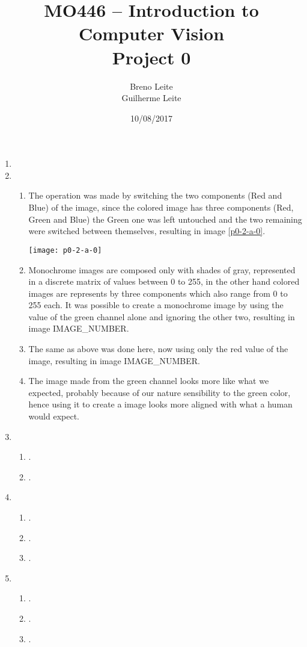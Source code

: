\documentclass[12pt,a4paper]{article}
\title{MO446 -- Introduction to Computer Vision  \\ Project 0}
\author{Breno Leite  \\ Guilherme Leite}
\date{10/08/2017}
\begin{document}
\maketitle

\begin{enumerate}
\item
\item
\begin{enumerate}
\item The operation was made by switching the two components (Red and Blue) of the image, since the colored image has three components (Red, Green and Blue) the Green one was left untouched and the two remaining were switched between themselves, resulting in image \ref{p0-2-a-0}.

\texttt{[image: p0-2-a-0]}

\item Monochrome images are composed only with shades of gray, represented in a discrete matrix of values between 0 to 255, in the other hand colored images are represents by three components which also range from 0 to 255 each. It was possible to create a monochrome image by using the value of the green channel alone and ignoring the other two, resulting in image IMAGE\_NUMBER.

\item The same as above was done here, now using only the red value of the image, resulting in image IMAGE\_NUMBER.

\item The image made from the green channel looks more like what we expected, probably because of our nature sensibility to the green color, hence using it to create a image looks more aligned with what a human would expect.
\end{enumerate}

\item
\begin{enumerate}
\item .

\item .
\end{enumerate}

\item
\begin{enumerate}
\item .

\item .

\item .
\end{enumerate}

\item
\begin{enumerate}
\item .

\item .

\item .
\end{enumerate}

\end{enumerate}
\end{document}
